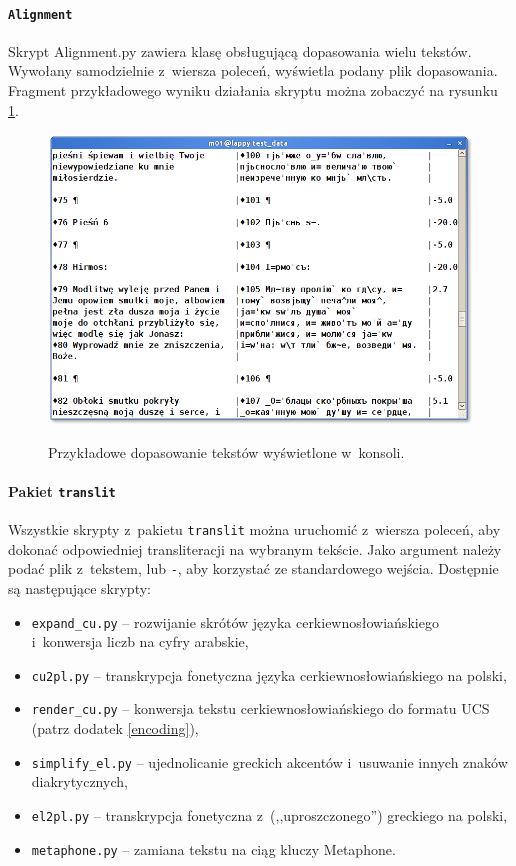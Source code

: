 \documentclass{pracamgr}
\begin{document}
\paragraph{{\tt Alignment}}
Skrypt Alignment.py zawiera klasę obsługującą dopasowania wielu
tekstów. Wywołany samodzielnie z~wiersza poleceń, wyświetla podany
plik dopasowania. Fragment przykładowego wyniku działania skryptu
można zobaczyć na rysunku \ref{f:alignment}.

\begin{figure}[h]
  \small
  \caption{Przykładowe dopasowanie tekstów wyświetlone w~konsoli.}
  \centering
    \includegraphics[width=5in]{console-alignment.png}
    \label{f:alignment}
\end{figure}

\paragraph{Pakiet {\tt translit}}
Wszystkie skrypty z~pakietu {\tt translit} można uruchomić z~wiersza
poleceń, aby dokonać odpowiedniej transliteracji na wybranym
tekście. Jako argument należy podać plik z~tekstem, lub {\tt -}, aby
korzystać ze standardowego wejścia. Dostępnie są następujące skrypty:

\begin{itemize}
\item {\tt expand\_cu.py} -- rozwijanie skrótów języka
  cerkiewno\-{}słowiańskiego i~konwersja liczb na cyfry arabskie,
\item {\tt cu2pl.py} -- transkrypcja fonetyczna języka
  cerkiewno\-{}słowiańskiego na polski,
\item {\tt render\_cu.py} -- konwersja tekstu
  cerkiewno\-{}słowiańskiego do formatu UCS (patrz dodatek
  \ref{encoding}),
\item {\tt simplify\_el.py} -- ujednolicanie greckich akcentów
  i~usuwanie innych znaków diakrytycznych,
\item {\tt el2pl.py} -- transkrypcja fonetyczna z~(,,uproszczonego'')
  greckiego na polski,
\item {\tt metaphone.py} -- zamiana tekstu na ciąg kluczy Metaphone.
\end{itemize}
\end{document}
